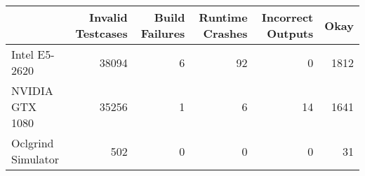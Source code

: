 \begin{tabular}{lrrrrr}
\toprule
{} &  Invalid Testcases &  Build Failures &  Runtime Crashes &  Incorrect Outputs &  Okay \\
\midrule
Intel E5-2620      &              38094 &               6 &               92 &                  0 &  1812 \\
NVIDIA GTX 1080    &              35256 &               1 &                6 &                 14 &  1641 \\
Oclgrind Simulator &                502 &               0 &                0 &                  0 &    31 \\
\bottomrule
\end{tabular}
